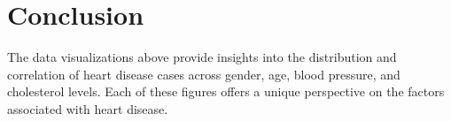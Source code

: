 \documentclass{article}
\begin{document}
	\section*{Conclusion}
	The data visualizations above provide insights into the distribution and correlation of heart disease cases across gender, age, blood pressure, and cholesterol levels. Each of these figures offers a unique perspective on the factors associated with heart disease.
	
\end{document}
